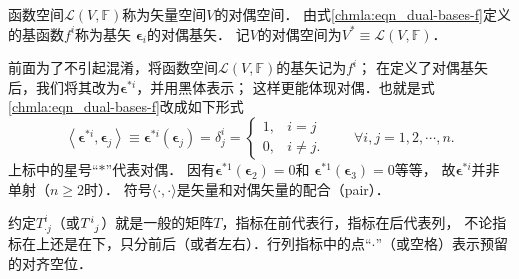 \begin{definition}\label{chmla:def_dual-space}
    函数空间$\mathscr{L}(V,\mathbb{F})$称为矢量空间$V$的{\heiti 对偶空间}．
    由式\eqref{chmla:eqn_dual-bases-f}定义的基函数$f^i$称为基矢
    $\boldsymbol{\epsilon}_i$的{\heiti 对偶基矢}．
    记$V$的对偶空间为$V^* \equiv \mathscr{L}(V,\mathbb{F})$．
\end{definition}

\begin{remark}\label{chmla:rem_inj11}
    前面为了不引起混淆，将函数空间$\mathscr{L}(V,\mathbb{F})$的基矢记为$f^i$；
    在定义了对偶基矢后，我们将其改为$\boldsymbol{\epsilon}^{*i}$，并用黑体表示；
    这样更能体现{\kaishu  对偶}．也就是式\eqref{chmla:eqn_dual-bases-f}改成如下形式
\begin{equation} \label{chmla:eqn_dual-bases}
    \left< \boldsymbol{\epsilon}^{*i}, \boldsymbol{\epsilon}_j \right>
    \equiv \boldsymbol{\epsilon}^{*i}(\boldsymbol{\epsilon}_j) =
    \delta^i _j =
    \begin{cases}
        1,& i=j \\ 0, & i\neq j.
    \end{cases}
    \qquad \forall i,j = 1,2,\cdots,n.
\end{equation}
上标中的星号“$*$”代表{\kaishu 对偶}．
因有$\boldsymbol{\epsilon}^{*1}(\boldsymbol{\epsilon}_2)=0$和
$\boldsymbol{\epsilon}^{*1}(\boldsymbol{\epsilon}_3)=0$等等，
故$\boldsymbol{\epsilon}^{*i}$并非单射（$n \geqslant 2$时）．
符号$\langle \cdot,\cdot\rangle$是矢量和对偶矢量的{\heiti 配合}（pair）．
\end{remark}


\begin{remark}\label{chmla:remark_matrixij}
    约定$T^{i}_{\cdot j}$（或$T^{i}_{\hphantom{a} j}$）就是一般的矩阵$T$，指标在前代表行，指标在后代表列，
    不论指标在上还是在下，只分前后（或者左右）．行列指标中的点“$\cdot$”（或空格）表示预留的对齐空位．
\end{remark}

